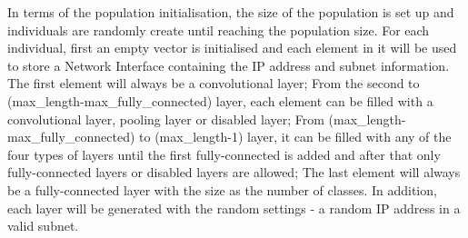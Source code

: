 \documentclass[conference]{IEEEtran}
\begin{document}

In terms of the population initialisation, the size of the population is set up and individuals are randomly create until reaching the population size. 
For each individual, first an empty vector is initialised and each element in it will be used to store a Network Interface containing the IP address and subnet information. The first element will always be a convolutional layer; From the second to (max\_length-max\_fully\_connected) layer, each element can be filled with a convolutional layer, pooling layer or disabled layer; From (max\_length-max\_fully\_connected) to (max\_length-1) layer, it can be filled with any of the four types of layers until the first fully-connected is added and after that only fully-connected layers or disabled layers are allowed; The last element will always be a fully-connected layer with the size as the number of classes. In addition, each layer will be generated with the random settings - a random IP address in a valid subnet.
\end{document}

